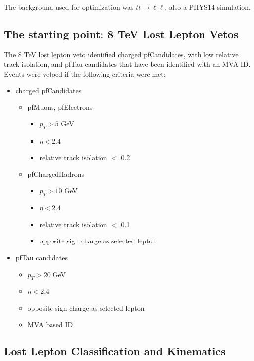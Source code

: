 The background used for optimization was $t\bar{t}{\rightarrow}\ell\ell$, also a PHYS14 simulation.  

\subsection{The starting point: 8 TeV Lost Lepton Vetos}
\label{sec:lost_lepton_studies:8TeV}

The 8 TeV lost lepton veto identified charged pfCandidates, with low relative track isolation, and pfTau candidates that have been identified with an MVA ID.  Events were vetoed if the following criteria were met:

\begin{itemize}
  \item charged pfCandidates
    \begin{itemize}
       \item pfMuons, pfElectrons
         \begin{itemize}
           \item $p_{T}>5$ GeV
           \item $\eta<2.4$
           \item relative track isolation $<$ 0.2
         \end{itemize}
       \item pfChargedHadrons
         \begin{itemize}
            \item $p_{T}>10$ GeV
            \item $\eta<2.4$
            \item relative track isolation $<$ 0.1
            \item opposite sign charge as selected lepton
         \end{itemize}
    \end{itemize}
  \item pfTau candidates
    \begin{itemize}
      \item $p_{T}>20$ GeV
      \item $\eta<2.4$
      \item opposite sign charge as selected lepton
      \item MVA based ID     
    \end{itemize}
\end{itemize}


\subsection{Lost Lepton Classification and Kinematics}
\label{sec:lost_lepton_studies:classification}

